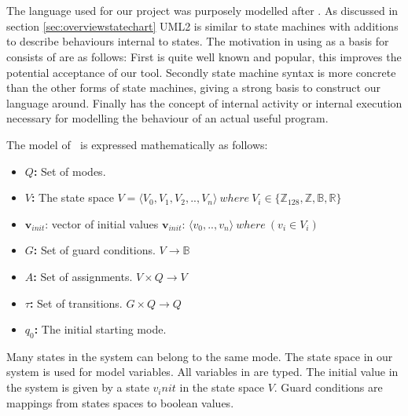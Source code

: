 \section{\plcchart}
\label{sec:statechartsem}

The language used for our project was purposely modelled after
 \cite{UML2}. As discussed 
in section \ref{sec:overviewstatechart} UML2 is similar to state 
machines with additions to describe behaviours internal to states.
The motivation in using  \cite{UML2}
as a basis for \emphasize{\plcchart} consists of are as follows: 
First  \cite{UML2}
is quite well known and popular, this improves the potential acceptance
of our tool. Secondly \cite{UML2}
state machine syntax is more concrete than the other forms of state
machines, giving a strong basis to construct our language around.
Finally \cite{UML2} has the
concept of internal activity or internal execution necessary for modelling
the behaviour of an actual useful program.

The model of \plcchart $\:$ is expressed mathematically as follows:

\begin{definition}
	\plcchart
	
\begin{itemize}
	\item \textbf{$Q$:} Set of modes.
	\item \textbf{$V$:} The state space $V = \langle V_0,V_1,V_2,..,V_n \rangle \: where \: V_{i}\in \lbrace \mathbb{Z}_{128}, \mathbb{Z}, \mathbb{B}, \mathbb{R} \rbrace$
	\item $\mathbf{v}_{init}$: vector of initial values $\mathbf{v}_{init}$: $\langle v_0,..,v_n \rangle \: where \: (v_i \in V_i)$
	\item \textbf{$G$:} Set of guard conditions. $V \rightarrow \mathbb{B}$
	\item \textbf{$A$:} Set of assignments. $V \times Q \rightarrow V$
	\item \textbf{$\tau$:} Set of transitions. $G \times Q \rightarrow Q$
	\item \textbf{$q_0$:} The initial starting mode.
\end{itemize}
\end{definition}

Many states in the system can belong to the same mode. The state space in our
system is used for model variables. All variables in \emphasize{\plcchart}
are typed. The initial value in the system is given by a state $v_init$ in
the state space $V$.  Guard conditions are mappings from states spaces
to boolean values.


